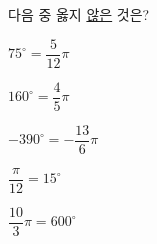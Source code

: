 다음 중 옳지 \underline{않은} 것은?
\begin{choices32}{\rule[-3ex]{0pt}{8ex}$75^\circ=\dfrac{5}{12}\pi$}{\rule[-3ex]{0pt}{8ex}$160^\circ=\dfrac{4}{5}\pi$}{\rule[-3ex]{0pt}{8ex}$-390^\circ=-\dfrac{13}{6}\pi$}{\rule[-3ex]{0pt}{8ex}$\dfrac{\pi}{12}=15^\circ$}{\rule[-3ex]{0pt}{8ex}$\dfrac{10}{3}\pi=600^\circ$}\end{choices32}
